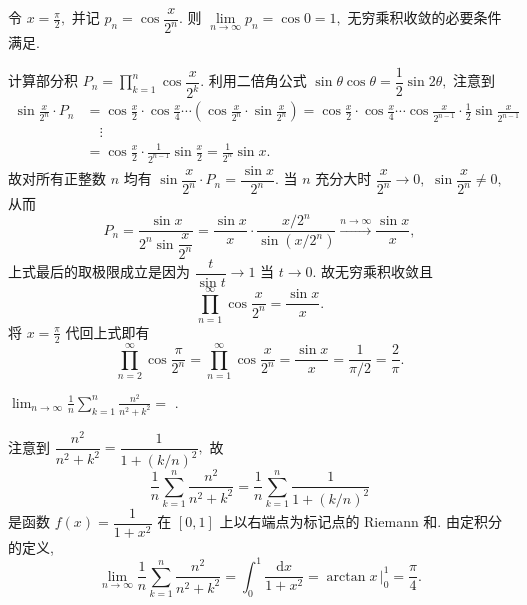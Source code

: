 \begin{solution}
令 $x = \frac{\pi}{2},$ 并记 $p_n = \cos \dfrac{x}{2^n}.$ 则 $\lim\limits_{n \to \infty} p_n = \cos 0 = 1,$ 无穷乘积收敛的必要条件满足.

计算部分积 $P_n = \prod_{k=1}^n \cos \dfrac{x}{2^k}.$ 利用二倍角公式 $\sin\theta \cos\theta = \dfrac{1}{2}\sin 2\theta,$ 注意到
\begin{align*}
\sin\frac{x}{2^n} \cdot P_n
&= \cos\frac{x}{2} \cdot \cos\frac{x}{4} \cdots \left( \cos\frac{x}{2^n} \cdot \sin\frac{x}{2^n} \right)
= \cos\frac{x}{2} \cdot \cos\frac{x}{4} \cdots \cos\frac{x}{2^{n-1}} \cdot \frac{1}{2}\sin\frac{x}{2^{n-1}} \\
&\quad \vdots \\
&= \cos\frac{x}{2} \cdot \frac{1}{2^{n-1}}\sin\frac{x}{2} = \frac{1}{2^n}\sin x.
\end{align*}
故对所有正整数 $n$ 均有 $\sin\dfrac{x}{2^n} \cdot P_n = \dfrac{\sin x}{2^n}.$ 当 $n$ 充分大时 $\dfrac{x}{2^n} \to 0,$ $\sin\dfrac{x}{2^n} \neq 0,$ 从而
\[
P_n = \frac{\sin x}{2^n \sin\dfrac{x}{2^n}} = \frac{\sin x}{x} \cdot \frac{x/2^n}{\sin(x/2^n)} \xrightarrow[]{n\to\infty} \frac{\sin x}{x},
\]
上式最后的取极限成立是因为 $\dfrac{t}{\sin t} \to 1$ 当 $t \to 0.$ 故无穷乘积收敛且
\[
\prod_{n=1}^\infty \cos \dfrac{x}{2^n} = \dfrac{\sin x}{x}.
\]
将 $x = \frac{\pi}{2}$ 代回上式即有
\[
\prod_{n=2}^{\infty} \cos \frac{\pi}{2^n} = \prod_{n=1}^\infty \cos \dfrac{x}{2^n} = \dfrac{\sin x}{x} = \frac{1}{\pi/2} = \frac{2}{\pi}.
\]
\end{solution}


\begin{question}
$\displaystyle\lim_{n\to\infty} \frac{1}{n}\sum_{k=1}^n \frac{n^2}{n^2+k^2} =$ \fillin[$\dfrac{\pi}{4}$].
\end{question}

\begin{solution}
注意到 $\dfrac{n^2}{n^2+k^2} = \dfrac{1}{1+(k/n)^2},$ 故
\begin{equation*}
\frac{1}{n}\sum_{k=1}^n \frac{n^2}{n^2+k^2} = \frac{1}{n}\sum_{k=1}^n \frac{1}{1+(k/n)^2}
\end{equation*}
是函数 $f(x) = \dfrac{1}{1+x^2}$ 在 $[0, 1]$ 上以右端点为标记点的 Riemann 和. 由定积分的定义,
\begin{equation*}
\lim_{n\to\infty} \frac{1}{n}\sum_{k=1}^n \frac{n^2}{n^2+k^2} = \int_0^1 \frac{\mathrm{d}x}{1+x^2} = \arctan x\,\Big|_0^1 = \frac{\pi}{4}.
\end{equation*}
\end{solution}


